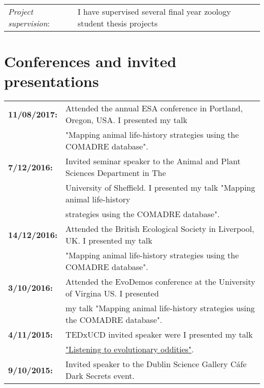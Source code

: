 \documentclass[10pt,a4paper]{article}
\begin{document}
\begin{tabular}{ll}
\textit{Project supervision}:&\hspace{5.7mm} I have supervised several final year zoology student thesis projects\\

\end{tabular}





\section{Conferences and invited presentations}

\raggedright
\begin{tabular}{ll}
\textbf{11/08/2017:} & Attended the annual ESA conference in Portland, Oregon, USA. I presented my talk\\ 
& "Mapping animal life-history strategies using the COMADRE database".\\ 
\textbf{7/12/2016:} & Invited seminar speaker to the Animal and Plant Sciences Department in The\\
& University of Sheffield. I presented my talk "Mapping animal life-history\\
& strategies using the COMADRE database".\\
\textbf{14/12/2016:} & Attended the British Ecological Society in Liverpool, UK. I presented my talk\\ 
& "Mapping animal life-history strategies using the COMADRE database".\\ 
\textbf{3/10/2016:} & Attended the EvoDemos conference at the University of Virgina US. I presented\\ 
& my talk "Mapping animal life-history strategies using the COMADRE database".\\
\textbf{4/11/2015:} & TEDxUCD invited speaker were I presented my talk\\
& \href{https://www.youtube.com/watch?v=-CHtfWEKifY}{"Listening to evolutionary oddities"}.\\ 
\textbf{9/10/2015:} & Invited speaker to the Dublin Science Gallery Cáfe Dark Secrets event.\\ 

\end{tabular}
\end{document}
